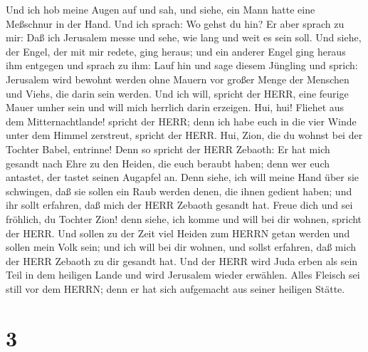  Und ich hob meine Augen auf und sah, und siehe, ein Mann
hatte eine Meßschnur in der Hand.  Und ich sprach: Wo gehst
du hin? Er aber sprach zu mir: Daß ich Jerusalem messe und sehe, wie
lang und weit es sein soll.  Und siehe, der Engel, der mit
mir redete, ging heraus; und ein anderer Engel ging heraus ihm entgegen
 und sprach zu ihm: Lauf hin und sage diesem Jüngling und
sprich: Jerusalem wird bewohnt werden ohne Mauern vor großer Menge der
Menschen und Viehs, die darin sein werden.  Und ich will,
spricht der HERR, eine feurige Mauer umher sein und will mich herrlich
darin erzeigen.  Hui, hui! Fliehet aus dem Mitternachtlande!
spricht der HERR; denn ich habe euch in die vier Winde unter dem Himmel
zerstreut, spricht der HERR.  Hui, Zion, die du wohnst bei
der Tochter Babel, entrinne!  Denn so spricht der HERR
Zebaoth: Er hat mich gesandt nach Ehre zu den Heiden, die euch beraubt
haben; denn wer euch antastet, der tastet seinen Augapfel an.
 Denn siehe, ich will meine Hand über sie schwingen, daß sie
sollen ein Raub werden denen, die ihnen gedient haben; und ihr sollt
erfahren, daß mich der HERR Zebaoth gesandt hat.  Freue
dich und sei fröhlich, du Tochter Zion! denn siehe, ich komme und will
bei dir wohnen, spricht der HERR.  Und sollen zu der Zeit
viel Heiden zum HERRN getan werden und sollen mein Volk sein; und ich
will bei dir wohnen, und sollst erfahren, daß mich der HERR Zebaoth zu
dir gesandt hat.  Und der HERR wird Juda erben als sein
Teil in dem heiligen Lande und wird Jerusalem wieder erwählen.
 Alles Fleisch sei still vor dem HERRN; denn er hat sich
aufgemacht aus seiner heiligen Stätte.

\hypertarget{section-2}{%
\section{3}\label{section-2}}

